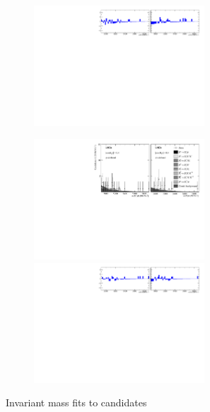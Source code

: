 \begin{figure}[!h]
\begin{subfigure}[t]{1.0\textwidth}
        \includegraphics[width=0.7\textwidth]{figs/Appendix_FitCategories/residuals_DsPhi_Ds2KPiPi_both_summed_splitHel_splitKKPi_s21_s21r1_s24_s26.pdf}
    \end{subfigure}
    \begin{subfigure}[t]{1.0\textwidth}
        \centering
        \includegraphics[width=0.7\textwidth]{figs/Appendix_FitCategories/canvas_DsPhiSide_Ds2KPiPi_both_summed_splitHel_splitKKPi_s21_s21r1_s24_s26.pdf}\\
        \includegraphics[width=0.7\textwidth]{figs/Appendix_FitCategories/residuals_DsPhiSide_Ds2KPiPi_both_summed_splitHel_splitKKPi_s21_s21r1_s24_s26.pdf}
    \end{subfigure}
    \caption{Invariant mass fits to \decay{\Bp}{\Dsp\phiz} candidates}
\end{figure}

